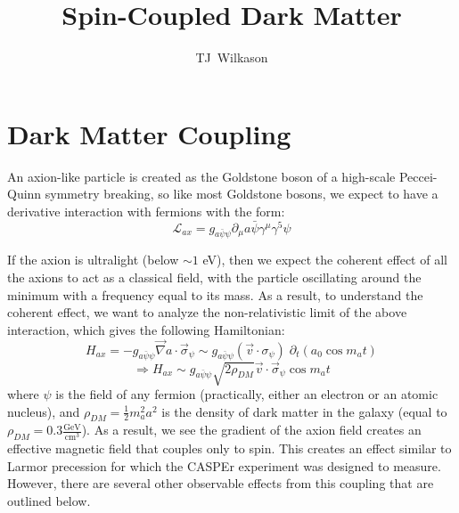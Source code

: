 \documentclass[aps,prd,final,letterpaper]{revtex4}
\newcommand{\coupling}{g_{a\bar{\psi}\psi}}
\begin{document}
\title{Spin-Coupled Dark Matter}
\author{TJ~Wilkason}

\begin{abstract}
\noindent	

\end{abstract}

\maketitle

\section{Dark Matter Coupling}

An axion-like particle is created as the Goldstone boson of a high-scale Peccei-Quinn symmetry breaking, so like most Goldstone bosons, we expect to have a derivative interaction with fermions with the form:
\begin{equation}
\mathcal{L}_{ax} = \coupling \partial_{\mu} a\bar{\psi}\gamma^{\mu}\gamma^{5}\psi
\end{equation}

If the axion is ultralight (below $\sim 1$ eV), then we expect the coherent effect of all the axions to act as a classical field, with the particle oscillating around the minimum with a frequency equal to its mass. As a result, to understand the coherent effect, we want to analyze the non-relativistic limit of the above interaction, which gives the following Hamiltonian:
\begin{equation}
H_{ax} = -\coupling\vec{\nabla}a \cdot \vec{\sigma}_{\psi} \sim \coupling\left(\vec{v}\cdot \sigma_{\psi}\right)\;\partial_t \left(a_0 \cos{m_a t}\right) 
\end{equation}
\begin{equation}
\Rightarrow H_{ax} \sim \coupling\sqrt{2\rho_{DM}}\vec{v} \cdot \vec{\sigma}_{\psi} \cos{m_a t}
\end{equation}
where $\psi$ is the field of any fermion (practically, either an electron or an atomic nucleus), and $\rho_{DM} = \frac{1}{2}m_{a}^2a^2$ is the density of dark matter in the galaxy (equal to $\rho_{DM} = 0.3 \frac{\mathrm{GeV}}{\mathrm{cm}^3}$). As a result, we see the gradient of the axion field creates an effective magnetic field that couples only to spin. This creates an effect similar to Larmor precession for which the CASPEr experiment was designed to measure. However, there are several other observable effects from this coupling that are outlined below.
\end{document}
